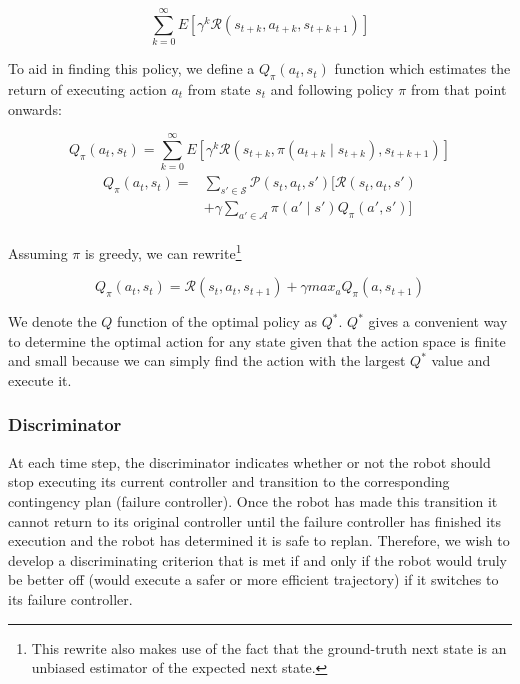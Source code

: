 \documentclass[letterpaper]{IEEEtran}
\begin{document}
				\begin{equation}\label{eq:discountedreturn}
					\sum_{k=0}^{\infty}E[\gamma^k \mathcal{R}(s_{t+k}, a_{t+k}, s_{t+k+1})]
				\end{equation}
				
				To aid in finding this policy, we define a $Q_{\pi}(a_t, s_t)$ function which estimates the return of executing action $a_t$ from state $s_t$ and following policy $\pi$ from that point onwards:
				
				\begin{equation}\label{eq:q}
					Q_{\pi}(a_t, s_t) = 
					\sum_{k=0}^{\infty}E[\gamma^k \mathcal{R}(s_{t+k}, \pi(a_{t+k} \mid s_{t+k}), s_{t+k+1})]
				\end{equation}
				\begin{align}
					\begin{split}\label{eq:bellmanexpect}
						Q_{\pi}(a_t, s_t) =& 
						\sum_{s'\in \mathcal{S}}\mathcal{P}(s_t, a_t, s')[\mathcal{R}(s_t, a_t, s') \\
						&+ \gamma \sum_{a'\in \mathcal{A}}\pi(a'\mid s')Q_{\pi}(a', s')]
					\end{split}
				\end{align}
				
				Assuming $\pi$ is greedy, we can rewrite\footnote{This rewrite also makes use of the fact that the ground-truth next state is an unbiased estimator of the expected next state.}
				
				\begin{equation}\label{eq:simplebellmanexpect}
					Q_{\pi}(a_t, s_t) = \mathcal{R}(s_t, a_t, s_{t+1}) + \gamma max_a Q_{\pi}(a, s_{t+1})
				\end{equation}
				
				We denote the $Q$ function of the optimal policy as $Q^*$. $Q^*$ gives a convenient way to determine the optimal action for any state given that the action space is finite and small because we can simply find the action with the largest $Q^*$ value and execute it.
				
			\subsubsection{Discriminator}
				At each time step, the discriminator indicates whether or not the robot should stop executing its current controller and transition to the corresponding contingency plan (failure controller). Once the robot has made this transition it cannot return to its original controller until the failure controller has finished its execution and the robot has determined it is safe to replan. Therefore, we wish to develop a discriminating criterion that is met if and only if the robot would truly be better off (would execute a safer or more efficient trajectory) if it switches to its failure controller.
				
\end{document}
